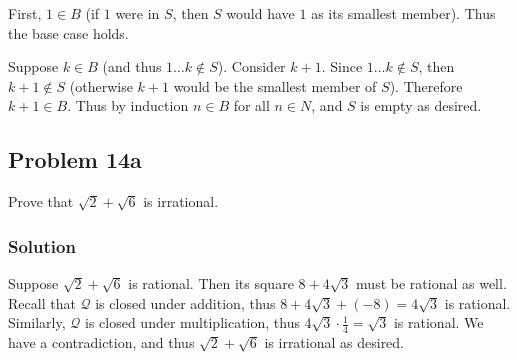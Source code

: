 \vs

First, $1\in B$ (if $1$ were in $S$, then $S$ would have $1$ as its smallest member). Thus the base case holds.

\vs

Suppose $k\in B$ (and thus $1\ldots k\not\in S$). Consider $k+1$. Since $1\ldots k\not\in S$, then $k+1\not\in S$ (otherwise $k+1$ would be the smallest member of $S$). Therefore $k+1\in B$. Thus by induction $n\in B$ for all $n\in N$, and $S$ is empty as desired.

\subsection*{Problem 14a}
Prove that $\sqrt{2}+\sqrt{6}$ is irrational.

\subsubsection*{Solution}
Suppose $\sqrt{2}+\sqrt{6}$ is rational. Then its square $8+4\sqrt{3}$ must be rational as well. Recall that $\mathcal{Q}$ is closed under addition, thus $8+4\sqrt{3}+(-8)=4\sqrt{3}$ is rational. Similarly, $\mathcal{Q}$ is closed under multiplication, thus $4\sqrt{3}\cdot\frac{1}{4}=\sqrt{3}$ is rational. We have a contradiction, and thus $\sqrt{2}+\sqrt{6}$ is irrational as desired.

